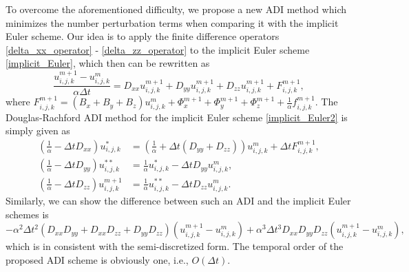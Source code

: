 \documentclass[dissertation]{uathesis}
\begin{document}
\begin{body}
To overcome the aforementioned difficulty, 
we propose a new ADI method which minimizes the number perturbation terms when comparing it with the implicit Euler scheme. Our idea is to apply the finite difference operators \eqref{delta_xx_operator}  - \eqref{delta_zz_operator} to the implicit Euler scheme \eqref{implicit_Euler}, which then can be rewritten as
\begin{equation} \label{implicit_Euler2}
\frac{u^{m+1}_{i,j,k}-u^{m}_{i,j,k}}{\alpha \Delta t} = 
D_{xx} u^{m+1}_{i,j,k} +D_{yy} u^{m+1}_{i,j,k} +D_{zz} u^{m+1}_{i,j,k} + F^{m+1}_{i,j,k},
\end{equation}
where $F^{m+1}_{i,j,k}=(B_{x}+B_{y}+B_{z})u^{m}_{i,j,k}+\Phi^{m+1}_{x}+\Phi^{m+1}_{y}+\Phi^{m+1}_{z}+\frac{1}{\alpha}f^{m+1}_{i,j,k}$. 
The Douglas-Rachford ADI method for the implicit Euler scheme \eqref{implicit_Euler2} is simply given as 
\begin{align}
(\frac{1}{\alpha}-\Delta t D_{xx}) u^{*}_{i,j,k}   &= (\frac{1}{\alpha} + \Delta t(D_{yy} + D_{zz})) u^{m}_{i,j,k} + \Delta t F^{m+1}_{i,j,k}, \nonumber \\
(\frac{1}{\alpha}-\Delta t D_{yy}) u^{**}_{i,j,k}  &= \frac{1}{\alpha} u^{*}_{i,j,k} - \Delta t D_{yy} u^{m}_{i,j,k}, \label{D_ADI_operator}  \\
(\frac{1}{\alpha}-\Delta t D_{zz}) u^{m+1}_{i,j,k} &= \frac{1}{\alpha} u^{**}_{i,j,k} - \Delta t D_{zz} u^{m}_{i,j,k}. \nonumber 
\end{align}
%
Similarly, we can show the difference between such an ADI and the implicit Euler schemes is 
\begin{equation} \label{perturbation}
- \alpha^2 \Delta t^{2} (D_{xx}D_{yy} + D_{xx}D_{zz} + D_{yy}D_{zz} ) (u^{m+1}_{i,j,k}-u^{m}_{i,j,k} )
+ \alpha^3 \Delta t^{3} D_{xx}D_{yy} D_{zz}  (u^{m+1}_{i,j,k}-u^{m}_{i,j,k} ),
\end{equation}
which is in consistent with the semi-discretized form. The temporal order of the proposed ADI scheme is obviously one, i.e., $O(\Delta t)$. 


\end{body}
\end{document}
